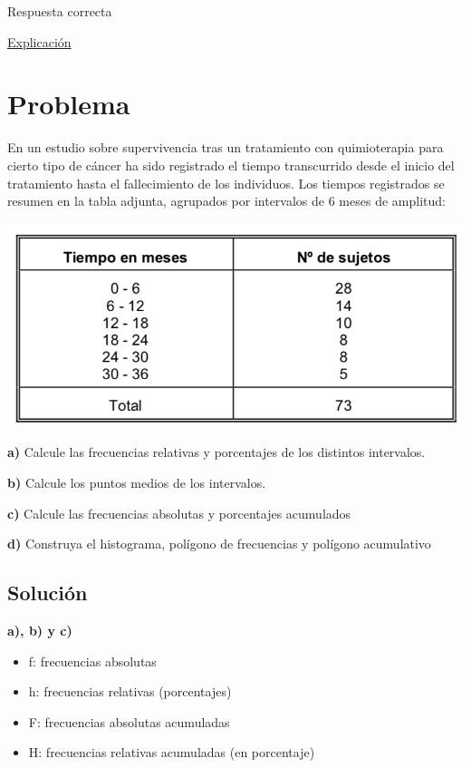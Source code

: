\documentclass[
]{book}
\providecommand{\tightlist}{%
  \setlength{\itemsep}{0pt}\setlength{\parskip}{0pt}}
\begin{document}
Respuesta correcta

\href{https://1fjmanzano.github.io/bioestadistica/me\%CC\%81todos-de-muestreo.html}{Explicación}

\hypertarget{problema-3}{%
\section{Problema}\label{problema-3}}

En un estudio sobre supervivencia tras un tratamiento con quimioterapia para cierto tipo de cáncer ha sido registrado el tiempo transcurrido desde el inicio del tratamiento hasta el fallecimiento de los individuos. Los tiempos registrados se resumen en la tabla adjunta, agrupados por intervalos de 6 meses de amplitud:

\includegraphics[width=10.44in]{img/1_1}

\textbf{a)} Calcule las frecuencias relativas y porcentajes de los distintos intervalos.

\textbf{b)} Calcule los puntos medios de los intervalos.

\textbf{c)} Calcule las frecuencias absolutas y porcentajes acumulados

\textbf{d)} Construya el histograma, polígono de frecuencias y polígono acumulativo

\hypertarget{soluciuxf3n-3}{%
\subsection{Solución}\label{soluciuxf3n-3}}

\textbf{a), b) y c)}

\begin{itemize}
\tightlist
\item
  f: frecuencias absolutas
\item
  h: frecuencias relativas (porcentajes)
\item
  F: frecuencias absolutas acumuladas
\item
  H: frecuencias relativas acumuladas (en porcentaje)
\end{itemize}
\end{document}
